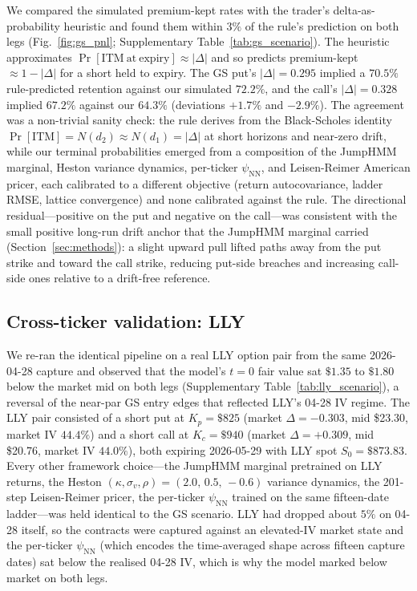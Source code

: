 We compared the simulated premium-kept rates with the trader's delta-as-probability heuristic and found them within $3\%$ of the rule's prediction on both legs (Fig.~\ref{fig:gs_pnl}; Supplementary Table~\ref{tab:gs_scenario}). The heuristic approximates $\Pr[\mathrm{ITM\ at\ expiry}] \approx |\Delta|$ and so predicts premium-kept $\approx 1 - |\Delta|$ for a short held to expiry. The GS put's $|\Delta| = 0.295$ implied a $70.5\%$ rule-predicted retention against our simulated $72.2\%$, and the call's $|\Delta| = 0.328$ implied $67.2\%$ against our $64.3\%$ (deviations $+1.7\%$ and $-2.9\%$). The agreement was a non-trivial sanity check: the rule derives from the Black-Scholes identity $\Pr[\mathrm{ITM}] = N(d_2) \approx N(d_1) = |\Delta|$ at short horizons and near-zero drift, while our terminal probabilities emerged from a composition of the JumpHMM marginal, Heston variance dynamics, per-ticker $\psi_{\mathrm{NN}}$, and Leisen-Reimer American pricer, each calibrated to a different objective (return autocovariance, ladder RMSE, lattice convergence) and none calibrated against the rule. The directional residual---positive on the put and negative on the call---was consistent with the small positive long-run drift anchor that the JumpHMM marginal carried (Section~\ref{sec:methods}): a slight upward pull lifted paths away from the put strike and toward the call strike, reducing put-side breaches and increasing call-side ones relative to a drift-free reference.

\subsection{Cross-ticker validation: LLY}\label{sec:lly_scenario}

We re-ran the identical pipeline on a real LLY option pair from the same 2026-04-28 capture and observed that the model's $t=0$ fair value sat $\$1.35$ to $\$1.80$ below the market mid on both legs (Supplementary Table~\ref{tab:lly_scenario}), a reversal of the near-par GS entry edges that reflected LLY's 04-28 IV regime. The LLY pair consisted of a short put at $K_p = \$825$ (market $\Delta = -0.303$, mid \$23.30, market IV $44.4\%$) and a short call at $K_c = \$940$ (market $\Delta = +0.309$, mid \$20.76, market IV $44.0\%$), both expiring 2026-05-29 with LLY spot $S_0 = \$873.83$. Every other framework choice---the JumpHMM marginal pretrained on LLY returns, the Heston $(\kappa,\sigma_v,\rho) = (2.0,\,0.5,\,-0.6)$ variance dynamics, the 201-step Leisen-Reimer pricer, the per-ticker $\psi_{\mathrm{NN}}$ trained on the same fifteen-date ladder---was held identical to the GS scenario. LLY had dropped about $5\%$ on 04-28 itself, so the contracts were captured against an elevated-IV market state and the per-ticker $\psi_{\mathrm{NN}}$ (which encodes the time-averaged shape across fifteen capture dates) sat below the realised 04-28 IV, which is why the model marked below market on both legs.


